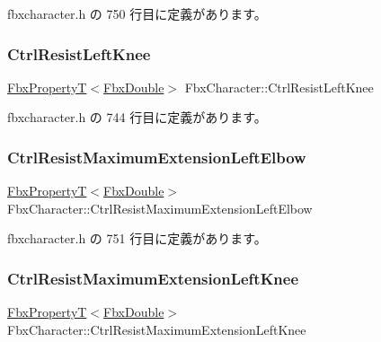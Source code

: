  fbxcharacter.\+h の 750 行目に定義があります。

\mbox{\label{class_fbx_character_afc99c4b02f770e151d137bbba9072a66}} 
\subsubsection{\texorpdfstring{Ctrl\+Resist\+Left\+Knee}{CtrlResistLeftKnee}}
{\footnotesize\ttfamily \hyperlink{class_fbx_property_t}{Fbx\+PropertyT}$<$\hyperlink{fbxtypes_8h_a171e72a1c46fc15c1a6c9c31948c1c5b}{Fbx\+Double}$>$ Fbx\+Character\+::\+Ctrl\+Resist\+Left\+Knee}



 fbxcharacter.\+h の 744 行目に定義があります。

\mbox{\label{class_fbx_character_abbb6f819a06cb579fe43d50d9e495858}} 
\subsubsection{\texorpdfstring{Ctrl\+Resist\+Maximum\+Extension\+Left\+Elbow}{CtrlResistMaximumExtensionLeftElbow}}
{\footnotesize\ttfamily \hyperlink{class_fbx_property_t}{Fbx\+PropertyT}$<$\hyperlink{fbxtypes_8h_a171e72a1c46fc15c1a6c9c31948c1c5b}{Fbx\+Double}$>$ Fbx\+Character\+::\+Ctrl\+Resist\+Maximum\+Extension\+Left\+Elbow}



 fbxcharacter.\+h の 751 行目に定義があります。

\mbox{\label{class_fbx_character_a4710a35401fed9aebd6ae900abf4d761}} 
\subsubsection{\texorpdfstring{Ctrl\+Resist\+Maximum\+Extension\+Left\+Knee}{CtrlResistMaximumExtensionLeftKnee}}
{\footnotesize\ttfamily \hyperlink{class_fbx_property_t}{Fbx\+PropertyT}$<$\hyperlink{fbxtypes_8h_a171e72a1c46fc15c1a6c9c31948c1c5b}{Fbx\+Double}$>$ Fbx\+Character\+::\+Ctrl\+Resist\+Maximum\+Extension\+Left\+Knee}



